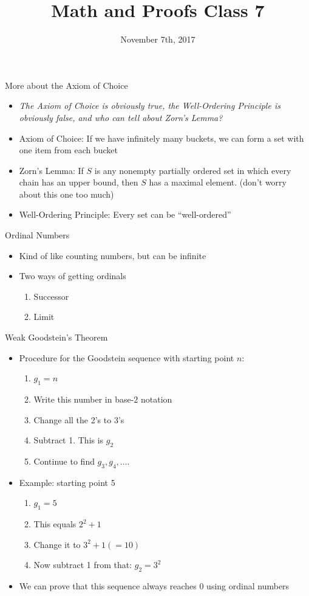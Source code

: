 \documentclass{beamer}
\begin{document}
\title[Math and Proofs]{Math and Proofs Class 7}
\date{November 7th, 2017}

\begin{frame}[plain]
\titlepage
\end{frame}

\begin{frame}{More about the Axiom of Choice}
\begin{itemize}
\item \textit{The Axiom of Choice is obviously true, the Well-Ordering Principle is obviously false, and who can tell about Zorn's Lemma?}
\item Axiom of Choice: If we have infinitely many buckets, we can form a set with one item from each bucket
\item Zorn's Lemma: If $S$ is any nonempty partially ordered set in which every chain has an upper bound, then $S$ has a maximal element. (don't worry about this one too much)
\item Well-Ordering Principle: Every set can be ``well-ordered''
\end{itemize}
\end{frame}


\begin{frame}{Ordinal Numbers}
\begin{itemize}
\item Kind of like counting numbers, but can be infinite
\item Two ways of getting ordinals
\begin{enumerate}
\item Successor
\item Limit
\end{enumerate}
\end{itemize}
\end{frame}

\begin{frame}{Weak Goodstein's Theorem}
\begin{itemize}
\item Procedure for the Goodstein sequence with starting point $n$:
\begin{enumerate}
\item $g_1=n$
\item Write this number in base-$2$ notation
\item Change all the 2's to 3's
\item Subtract 1. This is $g_2$
\item Continue to find $g_3, g_4,\ldots$.
\end{enumerate}
\item Example: starting point 5
\begin{enumerate}
\item $g_1 = 5$
\item This equals $2^2 + 1$
\item Change it to $3^2 + 1 (= 10)$
\item Now subtract 1 from that: $g_2 = 3^2$
\end{enumerate}
\item We can prove that this sequence always reaches 0 using ordinal numbers
\end{itemize}
\end{frame}
\end{document}
